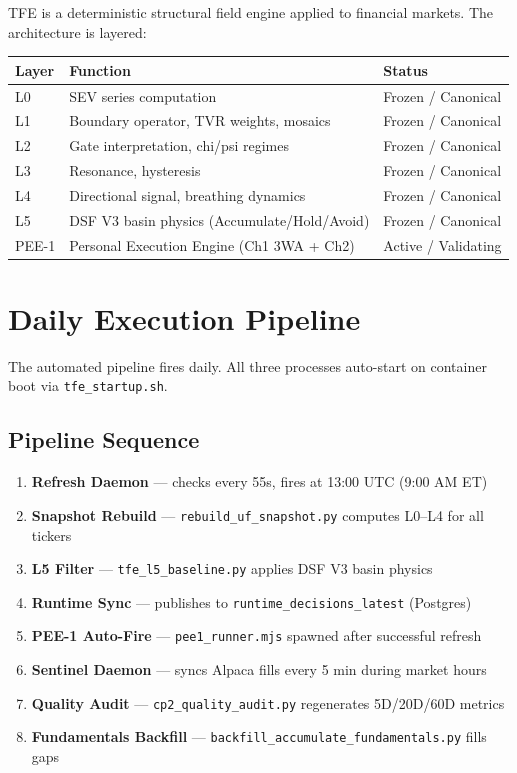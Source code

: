 \documentclass[11pt, a4paper]{article}
\begin{document}
TFE is a deterministic structural field engine applied to financial markets.
The architecture is layered:

\begin{center}
\begin{tabular}{@{}lll@{}}
\toprule
\textbf{Layer} & \textbf{Function} & \textbf{Status} \\
\midrule
L0 & SEV series computation & Frozen / Canonical \\
L1 & Boundary operator, TVR weights, mosaics & Frozen / Canonical \\
L2 & Gate interpretation, chi/psi regimes & Frozen / Canonical \\
L3 & Resonance, hysteresis & Frozen / Canonical \\
L4 & Directional signal, breathing dynamics & Frozen / Canonical \\
L5 & DSF V3 basin physics (Accumulate/Hold/Avoid) & Frozen / Canonical \\
PEE-1 & Personal Execution Engine (Ch1 3WA + Ch2) & Active / Validating \\
\bottomrule
\end{tabular}
\end{center}

\section{Daily Execution Pipeline}

The automated pipeline fires daily. All three processes auto-start on container boot
via \texttt{tfe\_startup.sh}.

\subsection{Pipeline Sequence}

\begin{enumerate}
  \item \textbf{Refresh Daemon} --- checks every 55s, fires at 13:00 UTC (9:00 AM ET)
  \item \textbf{Snapshot Rebuild} --- \texttt{rebuild\_uf\_snapshot.py} computes L0--L4 for all tickers
  \item \textbf{L5 Filter} --- \texttt{tfe\_l5\_baseline.py} applies DSF V3 basin physics
  \item \textbf{Runtime Sync} --- publishes to \texttt{runtime\_decisions\_latest} (Postgres)
  \item \textbf{PEE-1 Auto-Fire} --- \texttt{pee1\_runner.mjs} spawned after successful refresh
  \item \textbf{Sentinel Daemon} --- syncs Alpaca fills every 5 min during market hours
  \item \textbf{Quality Audit} --- \texttt{cp2\_quality\_audit.py} regenerates 5D/20D/60D metrics
  \item \textbf{Fundamentals Backfill} --- \texttt{backfill\_accumulate\_fundamentals.py} fills gaps
\end{enumerate}
\end{document}
